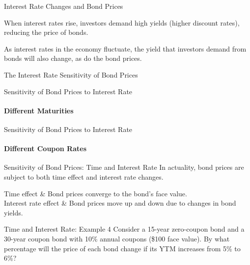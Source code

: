 \documentclass[9pt,aspectratio=169]{beamer}
\makeatletter
\newcommand{\keypoint}[1]{%
  \par\noindent
  \begingroup
  \usebeamercolor{keypoint}%
  \setlength{\fboxsep}{7pt}%
  \colorbox{bg}{\parbox{\dimexpr\linewidth-2\fboxsep\relax}{\color{fg}#1}}%
  \endgroup
  \par\medskip}
\newenvironment{terms}{%
  \renewcommand{\arraystretch}{1.35}%
  \tabularx{\linewidth}{@{}>{\bfseries\raggedright\arraybackslash}p{0.30\linewidth} X@{}}
  \toprule}
  {\bottomrule\endtabularx}
\makeatother
\begin{document}
\begin{frame}{Interest Rate Changes and Bond Prices}
\keypoint{When interest rates rise, investors demand high yields (higher discount rates),
reducing the price of bonds.}

As interest rates in the economy fluctuate, the yield that investors demand from bonds
will also change, as do the bond prices.
\end{frame}


\begin{frame}{The Interest Rate Sensitivity of Bond Prices}
\vspace{0.8em}
\begin{center}
\resizebox{\linewidth}{!}{}
\end{center}
\end{frame}


\begin{frame}{Sensitivity of Bond Prices to Interest Rate}
\framesubtitle{Different Maturities}
\begin{center}

\end{center}
\end{frame}


\begin{frame}{Sensitivity of Bond Prices to Interest Rate}
\framesubtitle{Different Coupon Rates}
\begin{center}

\end{center}
\end{frame}


\begin{frame}{Sensitivity of Bond Prices: Time and Interest Rate}
In actuality, bond prices are subject to both time effect and interest rate changes.

\vspace{0.9em}
\begin{terms}
Time effect & Bond prices converge to the bond's face value. \\
Interest rate effect & Bond prices move up and down due to changes in bond yields. \\
\end{terms}
\end{frame}


\begin{frame}{Time and Interest Rate: Example 4}
Consider a \textcolor{StAndrewsBlue}{15-year zero-coupon bond} and a \textcolor{StAndrewsGreen}{30-year coupon bond with 10\% annual coupons} (\$100 face value). By what percentage will the price of each bond change if its YTM increases from 5\% to 6\%?

\end{frame}
\end{document}
